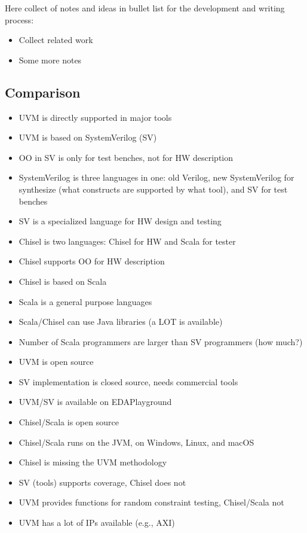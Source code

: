 \documentclass[conference]{IEEEtran}
\begin{document}
Here collect of notes and ideas in bullet list for the development and writing process:

\begin{itemize}
\item Collect related work
\item Some more notes
\end{itemize}

\subsection{Comparison}

\begin{itemize}
\item UVM is directly supported in major tools
\item UVM is based on SystemVerilog (SV)
\item OO in SV is only for test benches, not for HW description
\item SystemVerilog is three languages in one: old Verilog, new SystemVerilog for synthesize
(what constructs are supported by what tool), and SV for test benches
\item SV is a specialized language for HW design and testing
\item Chisel is two languages: Chisel for HW and Scala for tester
\item Chisel supports OO for HW description
\item Chisel is based on Scala
\item Scala is a general purpose languages
\item Scala/Chisel can use Java libraries (a LOT is available)
\item Number of Scala programmers are larger than SV programmers (how much?)
\item UVM is open source
\item SV implementation is closed source, needs commercial tools
\item UVM/SV is available on EDAPlayground
\item Chisel/Scala is open source
\item Chisel/Scala runs on the JVM, on Windows, Linux, and macOS
\item Chisel is missing the UVM methodology
\item SV (tools) supports coverage, Chisel does not
\item UVM provides functions for random constraint testing, Chisel/Scala not
\item UVM has a lot of IPs available (e.g., AXI)

\end{itemize}
\end{document}
